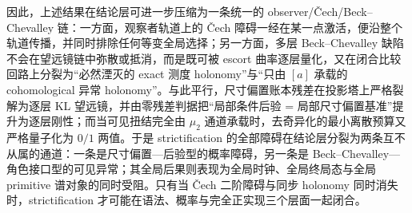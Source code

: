 



\noindent
因此，上述结果在结论层可进一步压缩为一条统一的 observer/Čech/Beck--Chevalley 链：一方面，观察者轨道上的 Čech 障碍一经在某一点激活，便沿整个轨道传播，并同时排除任何等变全局选择；另一方面，多层 Beck--Chevalley 缺陷不会在望远镜链中弥散或抵消，而是既可被 escort 曲率逐层量化，又在闭合比较回路上分裂为“必然湮灭的 exact 测度 holonomy”与“只由 \([a]\) 承载的 cohomological 异常 holonomy”。与此平行，尺寸偏置账本残差在投影塔上严格裂解为逐层 KL 望远镜，并由零残差判据把“局部条件后验 = 局部尺寸偏置基准”提升为逐层刚性；而当可见扭结完全由 \(\mu_2\) 通道承载时，去奇异化的最小离散预算又严格量子化为 \(0/1\) 两值。于是 strictification 的全部障碍在结论层分裂为两条互不从属的通道：一条是尺寸偏置—后验型的概率障碍，另一条是 Beck--Chevalley—角色接口型的可见异常；其全局后果则表现为全局时钟、全局终局态与全局 primitive 谱对象的同时受阻。只有当 Čech 二阶障碍与同步 holonomy 同时消失时，strictification 才可能在语法、概率与完全正实现三个层面一起闭合。

\endinput
